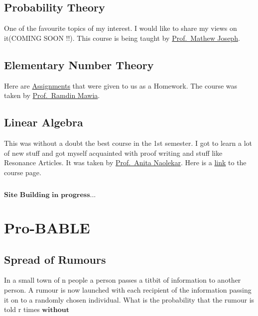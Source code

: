 \documentclass[
  letterpaper,
  DIV=11,
  numbers=noendperiod]{scrreprt}
\begin{document}
\section{Probability Theory}\label{probability-theory}

One of the favourite topics of my interest. I would like to share my
views on it(COMING SOON !!). This course is being taught by
\href{https://sites.google.com/view/mjoseph/home}{Prof.~Mathew Joseph}.

\section{Elementary Number Theory}\label{elementary-number-theory}

Here are
\href{https://drive.google.com/file/d/1a-w8kH7kZud-1WypK9IrwDW7UoYUFmZf/view?usp=sharing}{Assignments}
that were given to us as a Homework. The course was taken by
\href{https://sites.google.com/view/ramdinmawia/home}{Prof.~Ramdin
Mawia}.

\section{Linear Algebra}\label{linear-algebra}

This was without a doubt the best course in the 1st semester. I got to
learn a lot of new stuff and got myself acquainted with proof writing
and stuff like Resonance Articles. It was taken by
\href{https://www.isibang.ac.in/~statmath/homepage.html}{Prof.~Anita
Naolekar}. Here is a
\href{https://www.isibang.ac.in/~adean/infsys/database/Bmath/LAlg1.html}{link}
to the course page.

\section{}\label{section}

\(\textbf{Site Building in progress...}\)


\chapter{Pro-BABLE}\label{pro-bable}

\section{Spread of Rumours}\label{spread-of-rumours}

In a small town of n people a person passes a titbit of information to
another person. A rumour is now launched with each recipient of the
information passing it on to a randomly chosen individual. What is the
probability that the rumour is told r times \(\textbf{without}\)
\end{document}
